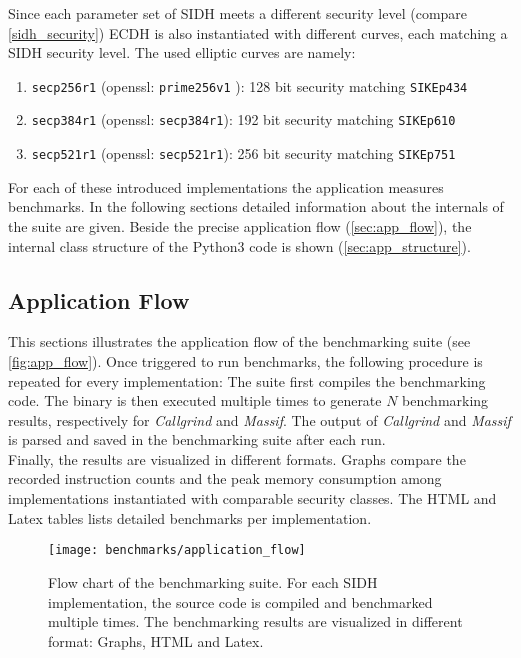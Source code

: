 Since each parameter set of SIDH meets a different security level (compare \autoref{sidh_security}) ECDH is also instantiated with different curves, each matching a SIDH security level. The used elliptic curves are namely:
\begin{enumerate}
\item \texttt{secp256r1} (openssl: \texttt{prime256v1} \parencite{turner2009elliptic}): 128 bit security matching \texttt{SIKEp434} \parencite{brown2010sec}
\item \texttt{secp384r1} (openssl: \texttt{secp384r1}): 192 bit security matching \texttt{SIKEp610} \parencite{brown2010sec}
\item \texttt{secp521r1} (openssl: \texttt{secp521r1}): 256 bit security  matching \texttt{SIKEp751} \parencite{brown2010sec}
\end{enumerate}
For each of these introduced implementations the application measures benchmarks. In the following sections detailed information about the internals of the suite are given. Beside the precise application flow (\autoref{sec:app_flow}), the internal class structure of the Python3 code is shown (\autoref{sec:app_structure}).

\subsection{Application Flow}\label{sec:app_flow}
This sections illustrates the application flow of the benchmarking suite (see \autoref{fig:app_flow}). Once triggered to run benchmarks, the following procedure is repeated for every implementation: The suite first compiles the benchmarking code. The binary is then executed multiple times to generate $N$ benchmarking results, respectively for \textit{Callgrind} and \textit{Massif}. The output of \textit{Callgrind} and \textit{Massif} is parsed and saved in the benchmarking suite after each run.
\\
Finally, the results are visualized in different formats. Graphs compare the recorded instruction counts and the peak memory consumption among implementations instantiated with comparable security classes. The HTML and Latex tables lists detailed benchmarks per implementation.

\begin{figure}[H]
  \centering
  \texttt{[image: benchmarks/application\_flow]}
  \caption[Flow chart of the benchmarking suite.]
  {Flow chart of the benchmarking suite. For each SIDH implementation, the source code is compiled and benchmarked multiple times. The benchmarking results are visualized in different format: Graphs, HTML and Latex.
  } \label{fig:app_flow}
\end{figure}




